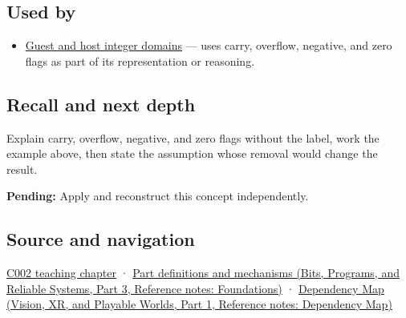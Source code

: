 \subsection{Used by}\label{appendix-8d687c9c08ab-used-by}

\hypertarget{appendix-8d687c9c08ab-used-by}{}

\begin{itemize}
\tightlist
\item
  \hyperref[appendix-33e7a011b684]{Guest and host integer domains} --- uses carry, overflow, negative, and zero flags as part of its representation or reasoning.
\end{itemize}

\subsection{Recall and next depth}\label{appendix-8d687c9c08ab-recall-and-next-depth}

\hypertarget{appendix-8d687c9c08ab-recall-and-next-depth}{}

Explain carry, overflow, negative, and zero flags without the label, work the example above, then state the assumption whose removal would change the result.

\textbf{Pending:} Apply and reconstruct this concept independently.

\subsection{Source and navigation}\label{appendix-8d687c9c08ab-source-and-navigation}

\hypertarget{appendix-8d687c9c08ab-source-and-navigation}{}

\hyperref[01-foundations-i-ch001-arithmetic-becomes-a-policy]{C002 teaching chapter} · \href{../01-Bits-Programs-and-Reliable-Systems-P03/main.pdf\#nameddest=appendix-fd090d982a15}{Part definitions and mechanisms (Bits, Programs, and Reliable Systems, Part 3, Reference notes: Foundations)} · \href{../07-Vision-XR-and-Playable-Worlds-P01/main.pdf\#nameddest=appendix-4ad47bdd269a}{Dependency Map (Vision, XR, and Playable Worlds, Part 1, Reference notes: Dependency Map)}
